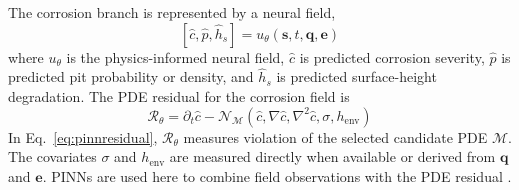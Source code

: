 \documentclass[colorlinks,upint,subscriptcorrection,varvw,hyphenate,balance]{asmeconf}
\newcommand{\vect}[1]{\bm{#1}}
\begin{document}
The corrosion branch is represented by a neural field,
\begin{equation}
\left[\hat{c},\hat{p},\hat{h}_s\right]=u_{\theta}(\vect{s},t,\vect{q},\vect{e})
\label{eq:neuralfield}
\end{equation}
where $u_{\theta}$ is the physics-informed neural field, $\hat{c}$ is predicted corrosion severity, $\hat{p}$ is predicted pit probability or density, and $\hat{h}_s$ is predicted surface-height degradation. The PDE residual for the corrosion field is
\begin{equation}
\mathcal{R}_{\theta}=\partial_t\hat{c}-\mathcal{N}_{\mathcal{M}}\left(\hat{c},\nabla\hat{c},\nabla^2\hat{c},\sigma,h_{\mathrm{env}}\right)
\label{eq:pinnresidual}
\end{equation}
In Eq.~\eqref{eq:pinnresidual}, $\mathcal{R}_{\theta}$ measures violation of the selected candidate PDE $\mathcal{M}$. The covariates $\sigma$ and $h_{\mathrm{env}}$ are measured directly when available or derived from $\vect{q}$ and $\vect{e}$. PINNs are used here to combine field observations with the PDE residual \cite{raissi2019pinn}.
\end{document}
